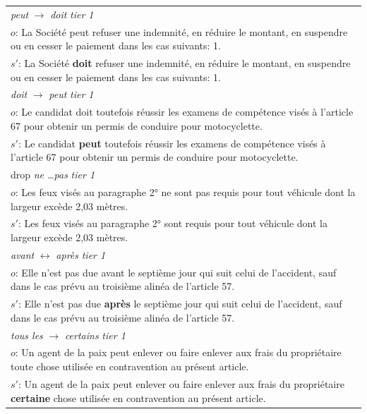 \begin{tabular}{@{}p{}@{}}
\toprule
\emph{peut} $\rightarrow$ \emph{doit} \hfill \emph{tier 1} \\[1pt]
\footnotesize $o$: La Société peut refuser une indemnité, en réduire le montant, en suspendre ou en cesser le paiement dans les cas suivants: 1. \\[1pt]
\footnotesize $s'$: La Société \textbf{doit} refuser une indemnité, en réduire le montant, en suspendre ou en cesser le paiement dans les cas suivants: 1. \\
\midrule
\emph{doit} $\rightarrow$ \emph{peut} \hfill \emph{tier 1} \\[1pt]
\footnotesize $o$: Le candidat doit toutefois réussir les examens de compétence visés à l'article 67 pour obtenir un permis de conduire pour motocyclette. \\[1pt]
\footnotesize $s'$: Le candidat \textbf{peut} toutefois réussir les examens de compétence visés à l'article 67 pour obtenir un permis de conduire pour motocyclette. \\
\midrule
drop \emph{ne \dots pas} \hfill \emph{tier 1} \\[1pt]
\footnotesize $o$: Les feux visés au paragraphe 2° ne sont pas requis pour tout véhicule dont la largeur excède 2,03 mètres. \\[1pt]
\footnotesize $s'$: Les feux visés au paragraphe 2° sont requis pour tout véhicule dont la largeur excède 2,03 mètres. \\
\midrule
\emph{avant} $\leftrightarrow$ \emph{apr\`es} \hfill \emph{tier 1} \\[1pt]
\footnotesize $o$: Elle n'est pas due avant le septième jour qui suit celui de l'accident, sauf dans le cas prévu au troisième alinéa de l'article 57. \\[1pt]
\footnotesize $s'$: Elle n'est pas due \textbf{après} le septième jour qui suit celui de l'accident, sauf dans le cas prévu au troisième alinéa de l'article 57. \\
\midrule
\emph{tous les} $\rightarrow$ \emph{certains} \hfill \emph{tier 1} \\[1pt]
\footnotesize $o$: Un agent de la paix peut enlever ou faire enlever aux frais du propriétaire toute chose utilisée en contravention au présent article. \\[1pt]
\footnotesize $s'$: Un agent de la paix peut enlever ou faire enlever aux frais du propriétaire \textbf{certaine} chose utilisée en contravention au présent article. \\
\bottomrule
\end{tabular}